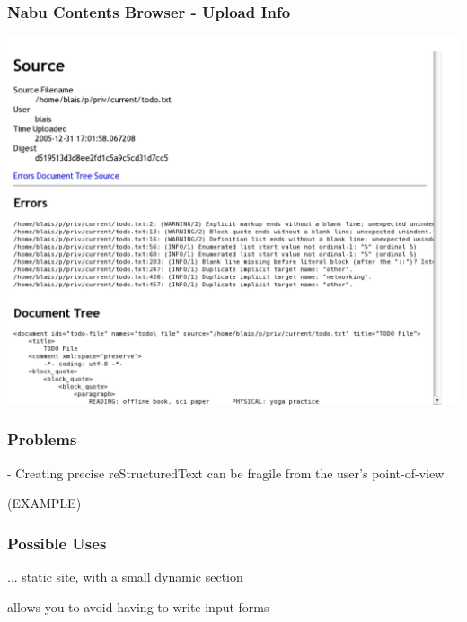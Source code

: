 \documentclass[compress,trans]{beamer}
\begin{document}
\begin{frame}[fragile]
  \frametitle{Nabu Contents Browser - Upload Info}

\includegraphics[width=1.0\textwidth]{ll-upload.pdf}

\end{frame}





\begin{frame}[fragile]
  \frametitle{Problems}

- Creating precise reStructuredText can be fragile from the user's point-of-view

(EXAMPLE)

\end{frame}



\begin{frame}[fragile]
  \frametitle{Possible Uses}

... static site, with a small dynamic section

allows you to avoid having to write input forms

% 



\end{frame}




\end{document}
